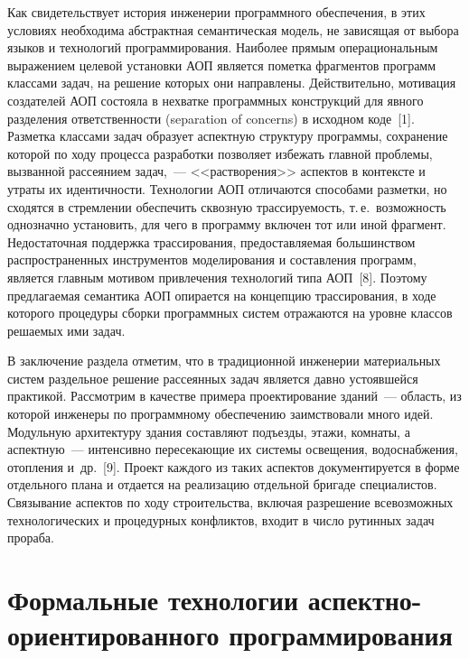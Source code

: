 \begin{multicols}{2}
   Как свидетельствует история инженерии программного обеспечения, в этих 
условиях необ\-ходима абстрактная семантическая модель, не завися\-щая от 
выбора языков и технологий программирования. Наиболее прямым 
операциональным выражением целевой установки АОП является пометка 
фрагментов программ классами задач, на решение которых они направлены. 
Действительно, мотивация создателей АОП состояла в нехватке про\-грам\-мных 
конструкций для явного разделения ответственности (separation of concerns) в 
исходном коде~[1]. Разметка классами задач образует аспектную структуру 
программы, сохранение которой по ходу процесса разработки позволяет 
избежать главной проблемы, вызванной рассеянием задач,~--- <<растворения>> 
аспектов в контексте и утраты их идентичности. Технологии АОП отличаются 
способами разметки, но сходятся в стремлении обеспечить сквозную 
трассируемость, т.\,е.\ возможность однозначно установить, для чего в 
программу включен тот или иной фрагмент. Недостаточная поддержка 
трассирования, предо\-став\-ля\-емая большинством распространенных 
инструментов моделирования и составления программ, является главным 
мотивом привлечения технологий типа АОП~[8]. Поэтому предлагаемая 
семантика АОП опирается на концепцию трассирования, в ходе которого 
процедуры сборки программных сис\-тем отражаются на уровне классов 
решаемых ими задач.
   
   В заключение раздела отметим, что в традиционной инженерии 
материальных систем раздельное решение рассеянных задач является давно 
устоявшейся практикой. Рассмотрим в качестве примера проектирование 
зданий~--- об\-ласть, из которой инженеры по программному обеспечению 
заимствовали много идей. Модульную архитектуру здания составляют 
подъезды, этажи, комнаты, а аспектную~--- интенсивно пересекающие их 
системы освещения, водоснабжения, отопления и~др.~[9]. Проект каждого из 
таких аспектов документируется в форме отдельного плана и отдается на 
реализацию отдельной бригаде специалистов. Связывание аспектов по ходу 
строительства, включая разрешение всевозможных технологических и 
процедурных конфликтов, входит в число рутинных задач про\-раба.

\section{Формальные технологии аспектно-ориентированного программирования}


\end{multicols}
